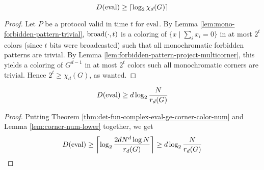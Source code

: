\begin{theorem}
  \label{thm:det-fun-complex-eval-ge-corner-color-num}

  $$D(\operatorname{eval}) \ge \lceil\log_2\chi_d(G)\rceil$$
\end{theorem}
\begin{proof}

  Let $P$ be a protocol valid in time $t$ for $\operatorname{eval}$. By Lemma \ref{lem:mono-forbidden-pattern-trivial}, $\operatorname{broad}(\cdot, t)$ is a coloring of $\{x \mid \sum_i x_i = 0\}$ in at most $2^t$ colors (since $t$ bits were broadcasted) such that all monochromatic forbidden patterns are trivial. By Lemma \ref{lem:forbidden-pattern-project-multicorner}, this yields a coloring of $G^{d - 1}$ in at most $2^t$ colors such all monochromatic corners are trivial. Hence $2^t \ge \chi_d(G)$, as wanted.
\end{proof}

\begin{corollary}
  \label{cor:det-fun-complex-eval-ge-corner-free-num}

  $$D(\operatorname{eval}) \ge d\log_2\frac N{r_d(G)}$$
\end{corollary}
\begin{proof}

  Putting Theorem \ref{thm:det-fun-complex-eval-ge-corner-color-num} and Lemma \ref{lem:corner-num-lower} together, we get
  $$D(\operatorname{eval}) \ge \left\lceil \log_2\frac{2dN^d\log N}{r_d(G)}\right\rceil \ge d\log_2\frac N{r_d(G)}$$
\end{proof}
